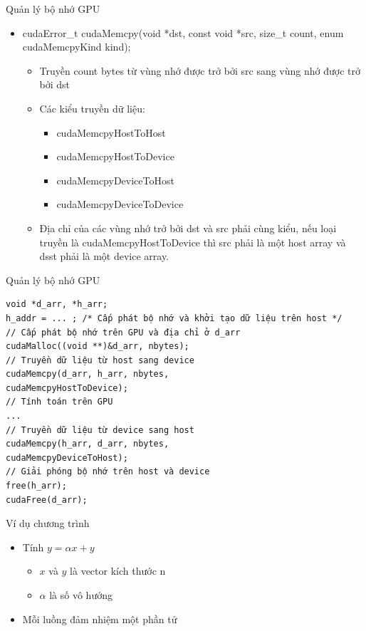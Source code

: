 \documentclass[10pt]{beamer}
\theoremstyle{remark}
\numberwithin{algocf}{section}
\numberwithin{equation}{section}
\numberwithin{dl}{section}
\numberwithin{figure}{section}
\begin{document}
\begin{frame}{Quản lý bộ nhớ GPU}
    \begin{itemize}
        \item cudaError\_t cudaMemcpy(void *dst, const void *src, size\_t count,
                                      enum cudaMemcpyKind kind);

        \begin{itemize}
            \item Truyền count bytes từ vùng nhớ được trở bởi src sang vùng nhớ được trở bởi dst
            \item Các kiểu truyền dữ liệu:
            \begin{itemize}
                \item cudaMemcpyHostToHost
                \item cudaMemcpyHostToDevice
                \item cudaMemcpyDeviceToHost
                \item cudaMemcpyDeviceToDevice
            \end{itemize}
            \item Địa chỉ của các vùng nhớ trở bởi dst và src phải cùng kiểu, nếu loại truyền là cudaMemcpyHostToDevice thì src phải là một host array và dsst phải là một device array.
        \end{itemize}
    \end{itemize}
    
\end{frame}

\begin{frame}[fragile]{Quản lý bộ nhớ GPU}
    \begin{verbatim}
void *d_arr, *h_arr;
h_addr = ... ; /* Cấp phát bộ nhớ và khởi tạo dữ liệu trên host */
// Cấp phát bộ nhớ trên GPU và địa chỉ ở d_arr
cudaMalloc((void **)&d_arr, nbytes);
// Truyền dữ liệu từ host sang device
cudaMemcpy(d_arr, h_arr, nbytes,
cudaMemcpyHostToDevice);
// Tính toán trên GPU
...
// Truyền dữ liệu từ device sang host
cudaMemcpy(h_arr, d_arr, nbytes,
cudaMemcpyDeviceToHost);
// Giải phóng bộ nhớ trên host và device
free(h_arr);
cudaFree(d_arr);
    \end{verbatim}
\end{frame}

\begin{frame}{Ví dụ chương trình}
    \begin{itemize}
        \item Tính $y=\alpha x + y$
        \begin{itemize}
            \item $x$ và $y$ là vector kích thước n
            \item $\alpha$ là số vô hướng
        \end{itemize}
        \item Mỗi luồng đảm nhiệm một phần tử
    \end{itemize}
\end{frame}
\end{document}
